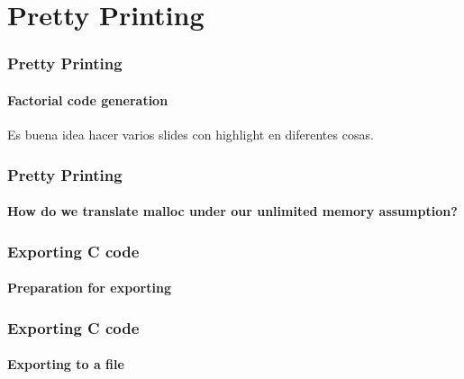 \section{Pretty Printing}

\begin{frame}
\frametitle{Pretty Printing}
\framesubtitle{Factorial code generation}


Es buena idea hacer varios slides con highlight en diferentes cosas.

\end{frame}


\begin{frame}
\frametitle{Pretty Printing}
\framesubtitle{How do we translate malloc under our unlimited memory assumption?}


\end{frame}


\begin{frame}
\frametitle{Exporting C code}
\framesubtitle{Preparation for exporting}


\end{frame}


\begin{frame}
\frametitle{Exporting C code}
\framesubtitle{Exporting to a file}


\end{frame}

